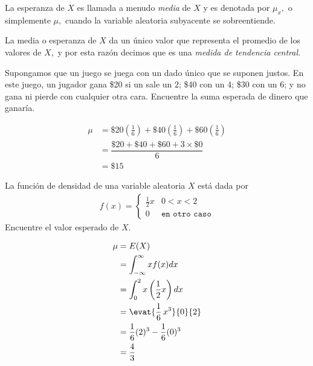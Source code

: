  La esperanza de $X$ es llamada a menudo \emph{media} de $X$ y es denotada por $\mu_{x},$ o simplemente $\mu,$ cuando la variable aleatoria subyacente se sobreentiende.


 La media o esperanza de $X$ da un único valor que representa el promedio de los valores de $X,$ y por esta razón decimos que es una \emph{medida de tendencia central.}



 \begin{ejemplo}
  \label{exmp:3.1}
  Supongamos que un juego se juega con un dado único que se suponen justos. En este juego, un jugador gana \$20 si un sale un $2$; \$40 con un $4$; \$30 con un $6$; y no gana ni pierde con cualquier otra cara. Encuentre la suma esperada de dinero que ganaría.
 \end{ejemplo}





 \begin{align*}
 \mu &= \$ 20 \left( \frac{1}{6} \right) + \$40 \left( \frac{1}{6} \right) + \$60\left( \frac{1}{6} \right) \\
   &= \dfrac{\$20 + \$40 + \$60 + 3\times\$ 0}{6} \\
   &= \$ 15
\end{align*}




 \begin{ejemplo}
  \label{exmp:3.2}
  La función de densidad de una variable aleatoria $X$ está dada por
  \begin{align*}
   f(x)=
   \begin{cases}
    \frac{1}{2}x & 0<x<2 \\
    0 & \texttt{en otro caso}
   \end{cases}
  \end{align*}
Encuentre el valor esperado de $X.$
 \end{ejemplo}



{}
\begin{align*}
 \mu &= E(X)\\ & = \int_{-\infty}^{\infty} xf(x) dx \\
  &= \int_{0}^{2} x\left( \dfrac{1}{2}x \right) dx\\
  &= \evat{\frac{1}{6} \, x^{3}}{0}{2}\\
  &= \frac{1}{6}(2)^{3}-\frac{1}{6}(0)^{3} \\
  &= \frac{4}{3}
\end{align*}


